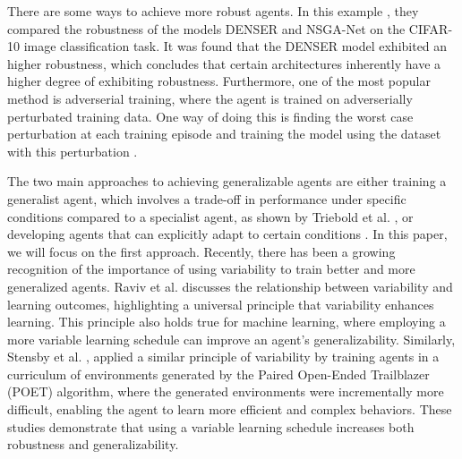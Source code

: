     There are some ways to achieve more robust agents. In this example \cite{Ines_Valentin_2022}, they compared the robustness of the models DENSER and NSGA-Net on the CIFAR-10 image classification task. It was found that the DENSER model exhibited an higher robustness, which concludes that certain architectures inherently have a higher degree of exhibiting robustness. Furthermore, one of the most popular method is adverserial training, where the agent is trained on adverserially perturbated training data. One way of doing this is finding the worst case perturbation at each training episode and training the model using the dataset with this perturbation \cite{Kai_Liang_Tan_2020}. 
    
    The two main approaches to achieving generalizable agents are either training a generalist agent, which involves a trade-off in performance under specific conditions compared to a specialist agent, as shown by Triebold et al. \cite{Corinna_Triebold}, or developing agents that can explicitly adapt to certain conditions \cite{Charles_Packer_2019}. In this paper, we will focus on the first approach. Recently, there has been a growing recognition of the importance of using variability to train better and more generalized agents. Raviv et al. \cite{Limor_Raviv_2022} discusses the relationship between variability and learning outcomes, highlighting a universal principle that variability enhances learning. This principle also holds true for machine learning, where employing a more variable learning schedule can improve an agent's generalizability. Similarly, Stensby et al. \cite{Emma_Stensby_2021}, applied a similar principle of variability by training agents in a curriculum of environments generated by the Paired Open-Ended Trailblazer (POET) algorithm, where the generated environments were incrementally more difficult, enabling the agent to learn more efficient and complex behaviors. These studies demonstrate that using a variable learning schedule increases both robustness and generalizability.